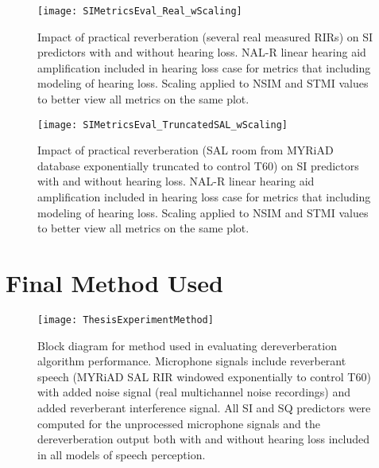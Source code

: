 \begin{figure}[H]
	\texttt{[image: SIMetricsEval\_Real\_wScaling]}
	\centering
	\caption{Impact of practical reverberation (several real measured RIRs) on SI predictors with and without hearing loss. NAL-R linear hearing aid amplification included in hearing loss case for metrics that including modeling of hearing loss.  Scaling applied to NSIM and STMI values to better view all metrics on the same plot.}
	\label{fig:SIMetricsEval_Real_wScaling}
\end{figure}

\begin{figure}[H]
	\texttt{[image: SIMetricsEval\_TruncatedSAL\_wScaling]}
	\centering
	\caption{Impact of practical reverberation (SAL room from MYRiAD database exponentially truncated to control T60) on SI predictors with and without hearing loss. NAL-R linear hearing aid amplification included in hearing loss case for metrics that including modeling of hearing loss.  Scaling applied to NSIM and STMI values to better view all metrics on the same plot.}
	\label{fig:SIMetricsEval_TruncatedSAL_wScaling}
\end{figure}

\section{Final Method Used}


\begin{sidewaysfigure}
	\texttt{[image: ThesisExperimentMethod]}%
	\label{fig:Evaluation_Block_Diagram}
	\caption{Block diagram for method used in evaluating dereverberation algorithm performance. Microphone signals include reverberant speech (MYRiAD SAL RIR windowed exponentially to control T60) with added noise signal (real multichannel noise recordings) and added reverberant interference signal. All SI and SQ predictors were computed for the unprocessed microphone signals and the dereverberation output both with and without hearing loss included in all models of speech perception.}
\end{sidewaysfigure}





